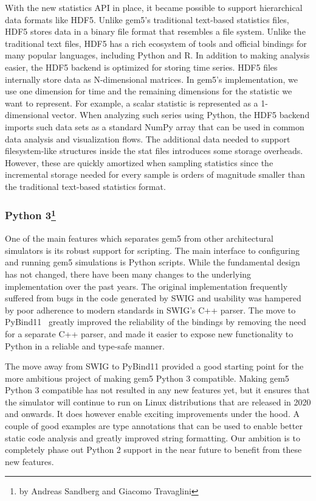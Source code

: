 With the new statistics API in place, it became possible to support hierarchical data formats like HDF5.
Unlike gem5's traditional text-based statistics files, HDF5 stores data in a binary file format that resembles a file system.
Unlike the traditional text files, HDF5 has a rich ecosystem of tools and official bindings for many popular languages, including Python and R.
 In addition to making analysis easier, the HDF5 backend is optimized for storing time series.
HDF5 files internally store data as N-dimensional matrices.
In gem5's implementation, we use one dimension for time and the remaining dimensions for the statistic we want to represent.
For example, a scalar statistic is represented as a 1-dimensional vector.
When analyzing such series using Python, the HDF5 backend imports such data sets as a standard NumPy array that can be used in common data analysis and visualization flows.
The additional data needed to support filesystem-like structures inside the stat files introduces some storage overheads.
However, these are quickly amortized when sampling statistics since the incremental storage needed for every sample is orders of magnitude smaller than the traditional text-based statistics format.

\subsubsection[Python 3]{Python 3\footnote{by Andreas Sandberg and Giacomo Travaglini}}

One of the main features which separates gem5 from other architectural simulators is its robust support for scripting.
The main interface to configuring and running gem5 simulations is Python scripts.
While the fundamental design has not changed, there have been many changes to the underlying implementation over the past years.
The original implementation frequently suffered from bugs in the code generated by SWIG and usability was hampered by poor adherence to modern standards in SWIG's C++ parser.
The move to PyBind11~\cite{} greatly improved the reliability of the bindings by removing the need for a separate C++ parser, and made it easier to expose new functionality to Python in a reliable and type-safe manner.

The move away from SWIG to PyBind11 provided a good starting point for the more ambitious project of making gem5 Python 3 compatible.
Making gem5 Python 3 compatible has not resulted in any new features yet, but it ensures that the simulator will continue to run on Linux distributions that are released in 2020 and onwards.
It does however enable exciting improvements under the hood.
A couple of good examples are type annotations that can be used to enable better static code analysis and greatly improved string formatting.
Our ambition is to completely phase out Python 2 support in the near future to benefit from these new features.

